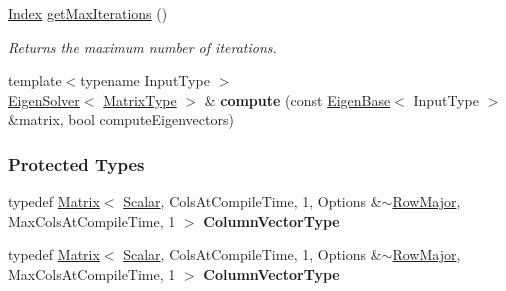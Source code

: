 \begin{DoxyCompactItemize}
\hyperlink{group___eigenvalues___module_a5bff6a6bc0efac67d52c60c2c3deb9ee}{Index} \hyperlink{group___eigenvalues___module_aa7668af4bcb47cd92cfe10640589d88f}{get\+Max\+Iterations} ()
\begin{DoxyCompactList}\small\item\em Returns the maximum number of iterations. \end{DoxyCompactList}\item 
\mbox{\label{group___eigenvalues___module_ac1e96e53ad36fabb8dda9578a5b7fb15}} 
{\footnotesize template$<$typename Input\+Type $>$ }\\\hyperlink{group___eigenvalues___module_class_eigen_1_1_eigen_solver}{Eigen\+Solver}$<$ \hyperlink{group___eigenvalues___module_a83acd180404ddaac8a678fa65a6b632b}{Matrix\+Type} $>$ \& {\bfseries compute} (const \hyperlink{group___core___module_struct_eigen_1_1_eigen_base}{Eigen\+Base}$<$ Input\+Type $>$ \&matrix, bool compute\+Eigenvectors)
\end{DoxyCompactItemize}
\subsubsection*{Protected Types}
\begin{DoxyCompactItemize}
\item 
\mbox{\label{group___eigenvalues___module_aac6c2c50adc1930bbb9fa7cfc699474a}} 
typedef \hyperlink{group___core___module_class_eigen_1_1_matrix}{Matrix}$<$ \hyperlink{group___eigenvalues___module_a017d49fe0d59874b70a2fcf35e5aa373}{Scalar}, Cols\+At\+Compile\+Time, 1, Options \&$\sim$\hyperlink{group__enums_ggaacded1a18ae58b0f554751f6cdf9eb13acfcde9cd8677c5f7caf6bd603666aae3}{Row\+Major}, Max\+Cols\+At\+Compile\+Time, 1 $>$ {\bfseries Column\+Vector\+Type}
\item 
\mbox{\label{group___eigenvalues___module_aac6c2c50adc1930bbb9fa7cfc699474a}} 
typedef \hyperlink{group___core___module_class_eigen_1_1_matrix}{Matrix}$<$ \hyperlink{group___eigenvalues___module_a017d49fe0d59874b70a2fcf35e5aa373}{Scalar}, Cols\+At\+Compile\+Time, 1, Options \&$\sim$\hyperlink{group__enums_ggaacded1a18ae58b0f554751f6cdf9eb13acfcde9cd8677c5f7caf6bd603666aae3}{Row\+Major}, Max\+Cols\+At\+Compile\+Time, 1 $>$ {\bfseries Column\+Vector\+Type}
\end{DoxyCompactItemize}
